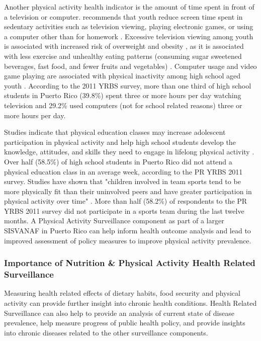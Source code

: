 \documentclass[12pt,letterpaper]{report}
\begin{document}
Another physical activity health indicator is the amount of time spent in front of a television or computer.  recommends that youth reduce screen time spent in sedentary activities such as television viewing, playing electronic games, or using a computer other than for homework \cite{GuiaAlimentariaPR}. Excessive television viewing among youth is associated with increased risk of overweight and obesity \cite{salmon2006television}, as it is associated with less exercise and unhealthy eating patterns (consuming sugar sweetened beverages, fast food, and fewer fruits and vegetables) \cite{coon2001relationships}. Computer usage and video game playing are associated with physical inactivity among high school aged youth \cite{fotheringham2000computer}. According to the 2011 YRBS survey, more than one third of high school students in Puerto Rico (39.8\%) spent three or more hours per day watching television and 29.2\% used computers (not for school related reasons) three or more hours per day.

Studies indicate that physical education classes may increase adolescent participation in physical activity and help high school students develop the knowledge, attitudes, and skills they need to engage in lifelong physical activity \cite{trudeau2005contribution, gordon2000determinants}. Over half (58.5\%) of high school students in Puerto Rico did not attend a physical education class in an average week, according to the PR YRBS 2011 survey. Studies have shown that "children involved in team sports tend to be more physically fit than their uninvolved peers and have greater participation in physical activity over time" \cite{weintraub2008team}. More than half (58.2\%) of respondents to the PR YRBS 2011 survey did not participate in a sports team during the last twelve months. A Physical Activity Surveillance component as part of a larger SISVANAF in Puerto Rico can help inform health outcome analysis and lead to improved assessment of policy measures to improve physical activity prevalence.

\subsubsection{Importance of Nutrition \& Physical Activity Health Related Surveillance}
Measuring health related effects of dietary habits, food security and physical activity can provide further insight into chronic health conditions. Health Related Surveillance can also help to provide an analysis of current state of disease prevalence, help measure progress of public health policy, and provide insights into chronic diseases related to the other surveillance components.
\end{document}
